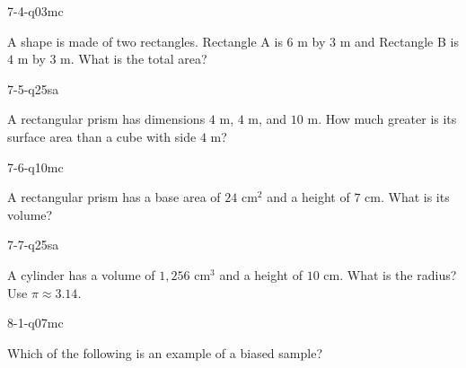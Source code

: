 \begin{practiceQuestion}{7-4-q03}{mc}
\begin{questionText}
A shape is made of two rectangles. Rectangle A is $6$ m by $3$ m and Rectangle B is $4$ m by $3$ m. What is the total area?
\end{questionText}
\end{practiceQuestion}

\begin{practiceQuestion}{7-5-q25}{sa}
\begin{questionText}
A rectangular prism has dimensions $4$ m, $4$ m, and $10$ m. How much greater is its surface area than a cube with side $4$ m?
\end{questionText}
\end{practiceQuestion}

\begin{practiceQuestion}{7-6-q10}{mc}
\begin{questionText}
A rectangular prism has a base area of $24$ cm$^2$ and a height of $7$ cm. What is its volume?
\end{questionText}
\end{practiceQuestion}

\begin{practiceQuestion}{7-7-q25}{sa}
\begin{questionText}
A cylinder has a volume of $1{,}256$ cm$^3$ and a height of $10$ cm. What is the radius? Use $\pi \approx 3.14$.
\end{questionText}
\end{practiceQuestion}

\begin{practiceQuestion}{8-1-q07}{mc}
\begin{questionText}
Which of the following is an example of a biased sample?
\end{questionText}
\end{practiceQuestion}


